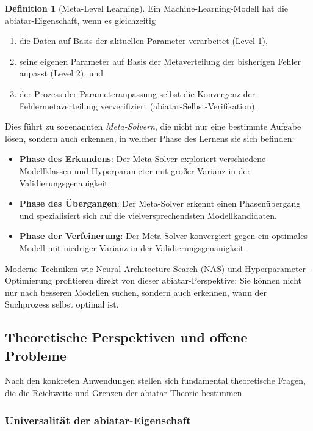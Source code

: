 \documentclass[a4paper,12pt]{article}
\theoremstyle{definition}
\newtheorem{definition}{Definition}
\begin{document}
\begin{definition}[Meta-Level Learning]
Ein Machine-Learning-Modell hat die abiatar-Eigenschaft, wenn es gleichzeitig
\begin{enumerate}
\item die Daten auf Basis der aktuellen Parameter verarbeitet (Level 1),
\item seine eigenen Parameter auf Basis der Metaverteilung der bisherigen Fehler anpasst (Level 2), und
\item der Prozess der Parameteranpassung selbst die Konvergenz der Fehlermetaverteilung ververifiziert (abiatar-Selbst-Verifikation).
\end{enumerate}
\end{definition}

Dies führt zu sogenannten \textit{Meta-Solvern}, die nicht nur eine bestimmte Aufgabe lösen, sondern auch erkennen, in welcher Phase des Lernens sie sich befinden:

\begin{itemize}
	\item \textbf{Phase des Erkundens}: Der Meta-Solver exploriert verschiedene Modellklassen und Hyperparameter mit großer Varianz in der Validierungsgenauigkeit.
	
	\item \textbf{Phase des Übergangen}: Der Meta-Solver erkennt einen Phasenübergang und spezialisiert sich auf die vielversprechendsten Modellkandidaten.
	
	\item \textbf{Phase der Verfeinerung}: Der Meta-Solver konvergiert gegen ein optimales Modell mit niedriger Varianz in der Validierungsgenauigkeit.
\end{itemize}

Moderne Techniken wie Neural Architecture Search (NAS) und Hyperparameter-Optimierung profitieren direkt von dieser abiatar-Perspektive: Sie können nicht nur nach besseren Modellen suchen, sondern auch erkennen, wann der Suchprozess selbst optimal ist.

\subsection{Theoretische Perspektiven und offene Probleme}

Nach den konkreten Anwendungen stellen sich fundamental theoretische Fragen, die die Reichweite und Grenzen der abiatar-Theorie bestimmen.

\subsubsection{Universalität der abiatar-Eigenschaft}
\end{document}
